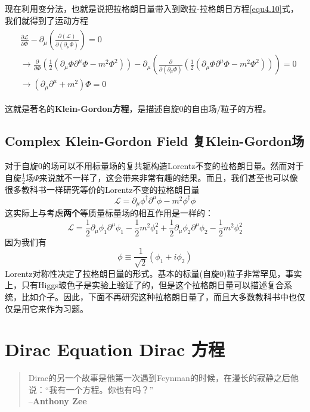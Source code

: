 现在利用变分法，也就是说把拉格朗日量带入到欧拉-拉格朗日方程\eqref{equ4.10}式，我们就得到了运动方程
\begin{align}
\label{equ6.5}
\begin{split}
&\frac{\partial\mathscr{L}}{\partial\Phi}-\partial_\mu\left(\frac{\partial(\mathscr{L})}{\partial(\partial_\mu\Phi)}\right)=0\\
&\rightarrow\frac{\partial}{\partial\Phi}\left(\frac{1}{2}(\partial_\mu\Phi\partial^\mu\Phi-m^2\Phi^2)\right)-\partial_\mu\left(\frac{\partial}{\partial(\partial_\mu\Phi)}\left(\frac{1}{2}(\partial_\mu\Phi\partial^\mu\Phi-m^2\Phi^2)\right)\right)=0 \\
&\rightarrow(\partial_\mu\partial^\mu+m^2)\Phi=0
\end{split}
\end{align}

这就是著名的{\bf Klein-Gordon方程}，是描述自旋$0$的自由场/粒子的方程。

\subsection[复Klein-Gordon场]{Complex Klein-Gordon Field \quad 复Klein-Gordon场}\label{sec6.2.1}

对于自旋$0$的场可以不用标量场的复共轭构造Lorentz不变的拉格朗日量。然而对于自旋$\frac{1}{2}$场$\Psi$来说就不一样了，这会带来非常有趣的结果。而且，我们甚至也可以像很多教科书一样研究等价的Lorentz不变的拉格朗日量
\[\mathscr{L}=\partial_\mu\phi^\dagger\partial^\mu\phi-m^2\phi^\dagger\phi \]
这实际上与考虑{\bf 两个}等质量标量场的相互作用是一样的：
\[\mathscr{L}=\frac{1}{2}\partial_\mu\phi_1\partial^\mu\phi_1-\frac{1}{2}m^2\phi_1^2+\frac{1}{2}\partial_\mu\phi_2\partial^\mu\phi_2-\frac{1}{2}m^2\phi_2^2 \]
因为我们有
\[\phi\equiv\frac{1}{\sqrt2}(\phi_1+i\phi_2) \]
Lorentz对称性决定了拉格朗日量的形式。基本的标量(自旋$0$)粒子非常罕见，事实上，只有Higgs玻色子是实验上验证了的，但是这个拉格朗日量可以描述复合系统，比如介子。因此，下面不再研究这种拉格朗日量了，而且大多数教科书中也仅仅是用它来作为习题。

\section[Dirac方程]{Dirac Equation \quad Dirac 方程}\label{sec6.3}
\begin{quote}
Dirac的另一个故事是他第一次遇到Feynman的时候，在漫长的寂静之后他说：“我有一个方程。你也有吗？”\\
\phantom{Dirac的另一个故事是他第一次遇到}--{\bf Anthony Zee}
\end{quote}

